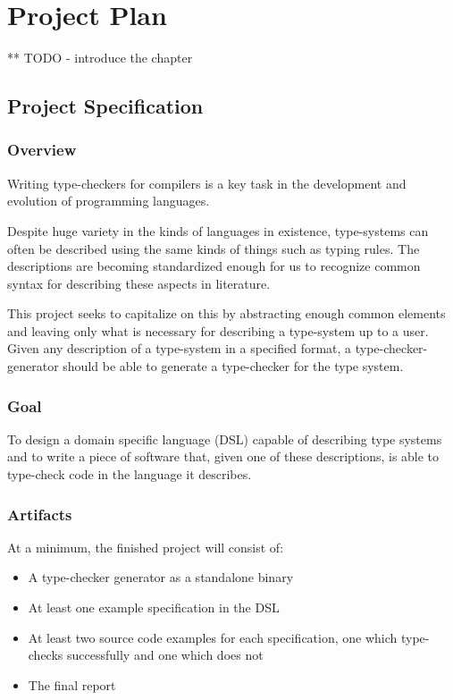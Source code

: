 \chapter{Project Plan}

** TODO - introduce the chapter

\section{Project Specification}

  \subsection{Overview}

  Writing type-checkers for compilers is a key task in the
  development and evolution of programming languages.

  Despite huge variety in the kinds of languages in existence,
  type-systems can often be described using the same kinds of
  things such as typing rules. The descriptions are becoming
  standardized enough for us to recognize common syntax for
  describing these aspects in literature.

  This project seeks to capitalize on this by abstracting
  enough common elements and leaving only what is necessary
  for describing a type-system up to a user. Given any
  description of a type-system in a specified format, a
  type-checker-generator should be able to generate a
  type-checker for the type system.
  
  \subsection{Goal}

  To design a domain specific language (DSL) capable of describing type systems and to
  write a piece of software that, given one of these
  descriptions, is able to type-check code in the language
  it describes.

  \subsection{Artifacts}
  \label{section-artifacts}

  At a minimum, the finished project will consist of:

  \begin{itemize}
  \item A type-checker generator as a standalone binary
  \item At least one example specification in the DSL
  \item At least two source code examples for each
    specification, one which type-checks successfully and one
    which does not
  \item The final report
  \end{itemize}
  
